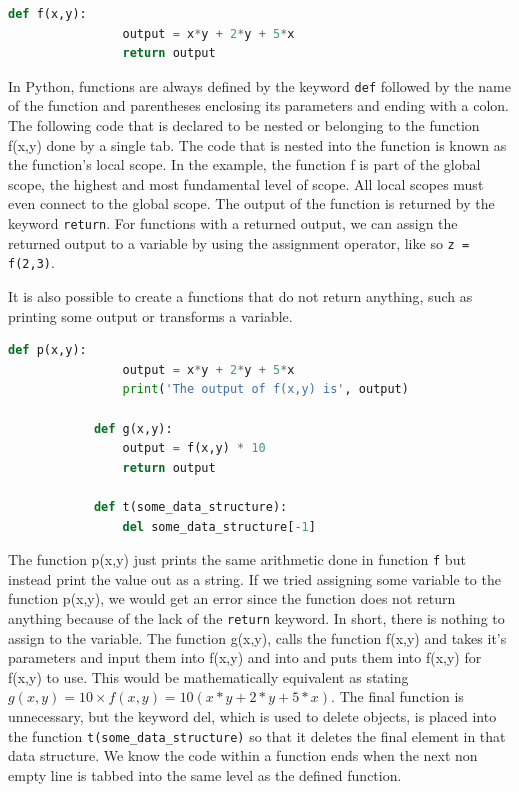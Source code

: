\documentclass[11pt,a4paper]{book}
\begin{document}
			\begin{lstlisting}[language=Python, caption = Defining a function in Python that performs arithmetic.]
			def f(x,y):
				output = x*y + 2*y + 5*x
				return output
			\end{lstlisting}
			
			In Python, functions are always defined by the keyword \lstinline|def| followed by the name of the function and parentheses enclosing its parameters and ending with a colon. The following code that is declared to be nested or belonging to the function f(x,y) done by a single tab. The code that is nested into the function is known as the function's local scope. In the example, the function f is part of the global scope, the highest and most fundamental level of scope. All local scopes must even connect to the global scope. The output of the function is returned by the keyword \lstinline|return|. For functions with a returned output, we can assign the returned output to a variable by using the assignment operator, like so \lstinline|z = f(2,3)|.
			
			It is also possible to create a functions that do not return anything, such as printing some output or transforms a variable.
			
			\begin{lstlisting}[language=Python, caption = Other types of functions in Python that do not return some output or variable.]
			def p(x,y):
				output = x*y + 2*y + 5*x
				print('The output of f(x,y) is', output)
			
			def g(x,y):
				output = f(x,y) * 10
				return output
				
			def t(some_data_structure):
				del some_data_structure[-1]
			\end{lstlisting}
			
			The function p(x,y) just prints the same arithmetic done in function \lstinline|f| but instead print the value out as a string. If we tried assigning some variable to the function p(x,y), we would get an error since the function does not return anything because of the lack of the \lstinline|return| keyword. In short, there is nothing to assign to the variable. The function g(x,y), calls the function f(x,y) and takes it's parameters and input them into f(x,y) and into and puts them into f(x,y) for f(x,y) to use. This would be mathematically equivalent as stating $g(x,y)=10 \times f(x,y) = 10(x*y + 2*y + 5*x)$. The final function is unnecessary, but the keyword del, which is used to delete objects, is placed into the function \lstinline|t(some_data_structure)| so that it deletes the final element in that data structure. We know the code within a function ends when the next non empty line is tabbed into the same level as the defined function. 
			
\end{document}
